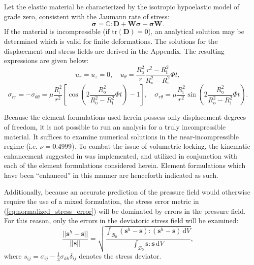 Let the elastic material be characterized by the isotropic hypoelastic model of grade zero, consistent with the Jaumann rate of stress:
\begin{equation}
  \dot{\boldsymbol{\sigma}} = \mathbb{C} : \bm{D} + \bm{W} \boldsymbol{\sigma} - \boldsymbol{\sigma} \bm{W}.
\end{equation}
If the material is incompressible (if $\text{tr} (\bm{D}) = 0$), an analytical solution may be determined which is valid for finite deformations. The solutions for the displacement and stress fields are derived in the Appendix. The resulting expressions are given below:
\begin{equation}
  u_r = u_z = 0, \quad u_\theta = \frac{R_{\mathrm o}^2}{r} \frac{r^2 - R_{\mathrm i}^2}{R_{\mathrm o}^{2} - R_{\mathrm i}^{2}} \Phi t,
  	\label{eq:annulus_u_exact}
\end{equation}
\begin{equation}
  \sigma_{rr} = - \sigma_{\theta \theta} = \mu \frac{R_{\mathrm i}^{2}}{r^{2}} \left[ \cos \left( 2 \frac{R_{\mathrm o}^{2}}{R_{\mathrm o}^{2} - R_{\mathrm i}^{2}} \Phi t \right) - 1 \right], \quad \sigma_{r \theta} = \mu \frac{R_{\mathrm i}^{2}}{r^{2}} \sin \left( 2 \frac{R_{\mathrm o}^{2}}{R_{\mathrm o}^{2} - R_{\mathrm i}^{2}} \Phi t \right).
  	\label{eq:annulus_s_exact}
\end{equation}

Because the element formulations used herein possess only displacement degrees of freedom, it is not possible to run an analysis for a truly incompressible material. It suffices to examine numerical solutions in the near-incompressible regime (i.e. $\nu = 0.4999$). To combat the issue of volumetric locking, the kinematic enhancement suggested in \cite{Rashid:06} was implemented, and utilized in conjunction with each of the element formulations considered herein. Element formulations which have been ``enhanced'' in this manner are henceforth indicated as such.

Additionally, because an accurate prediction of the pressure field would otherwise require the use of a mixed formulation, the stress error metric in (\ref{eq:normalized_stress_error}) will be dominated by errors in the pressure field. For this reason, only the errors in the deviatoric stress field will be examined:
\begin{equation}
	\frac{||\bm{s}^h - \bm{s}||}{||\bm{s}||} = \sqrt{\frac{\int_{\mathcal{B}_0} (\bm{s}^h - \bm{s}) \colon (\bm{s}^h - \bm{s}) \, \mathrm dV}{\int_{\mathcal{B}_0} \bm{s} \colon \bm{s} \, \mathrm dV}},
	\label{eq:deviator_stress_error}
\end{equation}
where $s_{ij} = \sigma_{ij} - \frac{1}{3} \sigma_{kk} \delta_{ij}$ denotes the stress deviator.

